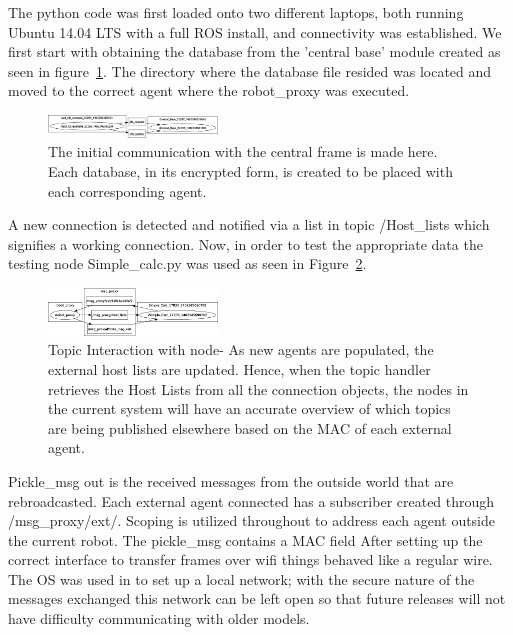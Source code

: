 \documentclass[conference]{IEEEtran}
\begin{document}
The python code was first loaded onto two different laptops, both running Ubuntu 14.04 LTS with a full ROS install, and connectivity was established. We first start with obtaining the database from the 'central base' module created as seen in figure~\ref{fig:TopicIntr1}. The directory where the database file resided was located and moved to the correct agent where the robot\_proxy was executed.

\begin{figure}[h]
\centering
\includegraphics[width=0.4\textwidth]{TopicIntr1}
\caption{The initial communication with the central frame is made here. Each database, in its encrypted form, is created to be placed with each corresponding agent.}
\label{fig:TopicIntr1}
\end{figure}

A new connection is detected and notified via a list in topic /Host\_lists which signifies a working connection. Now, in order to test the appropriate data the testing node Simple\_calc.py was used as seen in Figure~\ref{fig:TopicIntr2}.

\begin{figure}[h]
\centering
\includegraphics[width=0.4\textwidth]{TopicIntr2}
\caption{Topic Interaction with node- As new agents are populated, the external host lists are updated. Hence, when the topic handler retrieves the Host Lists from all the connection objects, the nodes in the current system will have an accurate overview of which topics are being published elsewhere based on the MAC of each external agent.}
\label{fig:TopicIntr2}
\end{figure}

Pickle\_msg out is the received messages from the outside world that are rebroadcasted. Each external agent connected has a subscriber created through /msg\_proxy/ext/. Scoping is utilized throughout to address each agent outside the current robot. The pickle\_msg contains a MAC field After setting up the correct interface to transfer frames over wifi things behaved like a regular wire. The OS was used in to set up a local network; with the secure nature of the messages exchanged this network can be left open so that future releases will not have difficulty communicating with older models. 
\end{document}

